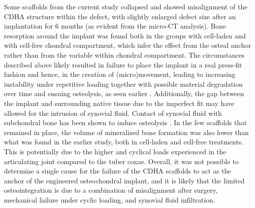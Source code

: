 \documentclass[twocolumn, empirical, authordate, issue]{jote-new-article}
\begin{document}
Some scaffolds from the current study collapsed and showed misalignment of the CDHA structure within the defect, with slightly enlarged defect size after an implantation for 6 months (as evident from the micro-CT analysis). Bone resorption around the implant was found both in the groups with cell-laden and with cell-free chondral compartment, which infer the effect from the osteal anchor rather than from the variable within chondral compartment. The circumstances described above likely resulted in failure to place the implant in a real press-fit fashion and hence, in the creation of (micro)movement, leading to increasing instability under repetitive loading together with possible material degradation over time and ensuing osteolysis, as seen earlier \parencite{Albrektsson2019, Goodman2019}. Additionally, the gap between the implant and surrounding native tissue due to the imperfect fit may have allowed for the intrusion of synovial fluid. Contact of synovial fluid with subchondral bone has been shown to induce osteolysis \parencite{Kold1986}. In the few scaffolds that remained in place, the volume of mineralized bone formation was also lower than what was found in the earlier study, both in cell-laden and cell-free treatments. This is potentially due to the higher and cyclical loads experienced in the articulating joint compared to the tuber coxae. Overall, it was not possible to determine a single cause for the failure of the CDHA scaffolds to act as the anchor of the engineered osteochondral implant, and it is likely that the limited osteointegration is due to a combination of misalignment after surgery, mechanical failure under cyclic loading, and synovial fluid infiltration.
\end{document}
